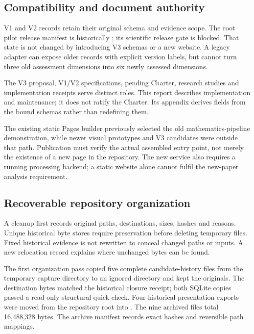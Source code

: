 \subsection{Compatibility and document authority}

 V1 and V2 records retain their original schema and evidence scope. The root pilot release manifest is historically ; its scientific release gate is blocked. That state is not changed by introducing V3 schemas or a new website. A legacy adapter can expose older records with explicit version labels, but cannot turn three old assessment dimensions into six newly assessed dimensions.

 The V3 proposal, V1/V2 specifications, pending Charter, research studies and implementation receipts serve distinct roles. This report describes implementation and maintenance; it does not ratify the Charter. Its appendix derives fields from the bound schemas rather than redefining them.

The existing static Pages builder previously selected the old mathematics-pipeline demonstration, while newer visual prototypes and V3 candidates were outside that path. Publication must verify the actual assembled entry point, not merely the existence of a new page in the repository. The new service also requires a running processing backend; a static website alone cannot fulfil the new-paper analysis requirement.

\subsection{Recoverable repository organization}

 A cleanup first records original paths, destinations, sizes, hashes and reasons. Unique historical byte stores require preservation before deleting temporary files. Fixed historical evidence is not rewritten to conceal changed paths or inputs. A new relocation record explains where unchanged bytes can be found.

The first organization pass copied five complete candidate-history files from the temporary capture directory to an ignored  directory and kept the originals. The destination bytes matched the historical closure receipt; both SQLite copies passed a read-only structural quick check. Four historical presentation exports were moved from the repository root into . The nine archived files total 16,488,328 bytes. The archive manifest records exact hashes and reversible path mappings.

